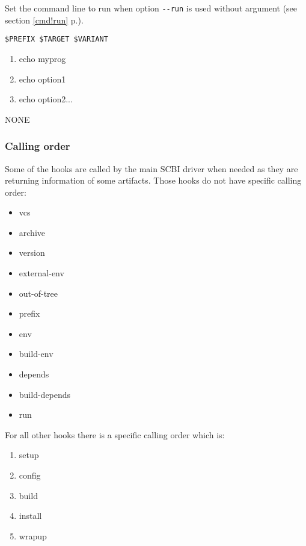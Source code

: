 \documentclass[a4paper,12pt,twoside]{article}
\newcommand{\code}[1]{\texttt{#1}}
\newcommand{\seeref}[1]{see section \ref{#1} p.\pageref{#1}}
\newcommand{\ddash}{-{}-}
\begin{document}
\begin{description}[font=\large\texttt]
	\item[<module>{[}-common|<variant>{]}-run] Set the command line to run when option \code{\ddash{}run} is used without argument (\seeref{cmd!run}).

	\begin{description}[font=\textit,style=standard]
		\item[parameter] \tabto{2cm} \code{\$PREFIX \$TARGET \$VARIANT}
		\begin{enumerate}
			\item echo myprog
			\item echo option1
			\item echo option2...
		\end{enumerate}
		\item[return] \tabto{2cm} NONE
	\end{description}

\end{description}

\subsubsection{Calling order}

Some of the hooks are called by the main SCBI driver when needed as they are returning information of some artifacts. Those hooks do not have specific calling order:

\begin{itemize}
	\item vcs
	\item archive
	\item version
	\item external-env
	\item out-of-tree
	\item prefix
	\item env
	\item build-env
	\item depends
	\item build-depends
	\item run
\end{itemize}

For all other hooks there is a specific calling order which is:

\begin{enumerate}
	\item setup
	\item config
	\item build
	\item install
	\item wrapup
\end{enumerate}
\end{document}
